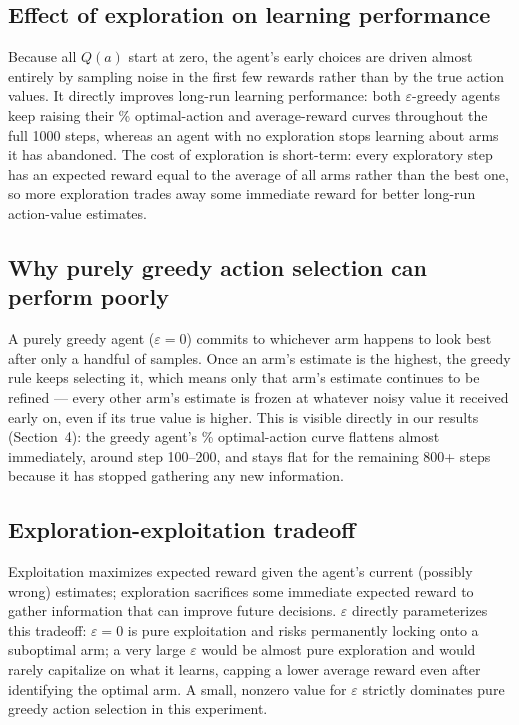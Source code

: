 \documentclass[11pt]{article}
\begin{document}
\subsection{Effect of exploration on learning performance}
Because all $Q(a)$ start at zero, the agent's early choices are driven almost entirely by
sampling noise in the first few rewards rather than by the true action values. It directly improves long-run learning
performance: both $\varepsilon$-greedy agents keep raising their \% optimal-action and average-reward curves throughout the full 1000 steps, whereas an agent with no exploration stops learning about arms it has abandoned. The cost of exploration is short-term: every
exploratory step has an expected reward equal to the average of all arms rather than the best one, so more exploration trades away some immediate reward for better long-run action-value
estimates.

\subsection{Why purely greedy action selection can perform poorly}
A purely greedy agent ($\varepsilon = 0$) commits to whichever arm happens to look best after
only a handful of samples. Once an arm's estimate is the highest, the greedy rule keeps
selecting it, which means only that arm's estimate continues to be refined --- every other
arm's estimate is frozen at whatever noisy value it received early on, even if its true value
is higher. 
This is visible directly in our results (Section~4): the greedy agent's \% optimal-action
curve flattens almost immediately, around step 100--200, and stays flat for the remaining
800+ steps because it has stopped gathering any new information.

\subsection{Exploration-exploitation tradeoff}
Exploitation maximizes expected reward given the agent's current (possibly wrong) estimates;
exploration sacrifices some immediate expected reward to gather information that can improve
future decisions. $\varepsilon$ directly parameterizes this tradeoff: $\varepsilon = 0$ is
pure exploitation and risks permanently locking onto a suboptimal arm; a very large
$\varepsilon$ would be almost pure exploration and would rarely capitalize on what it learns, capping a lower average reward even after identifying the optimal arm. A small, nonzero value for $\varepsilon$ strictly dominates pure
greedy action selection in this experiment.
\end{document}
